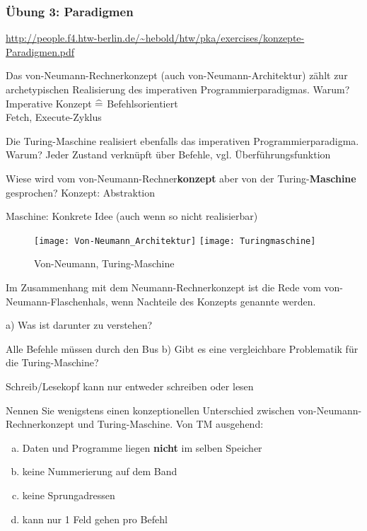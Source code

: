 \begin{card}
	\frametitle{Übung 3: Paradigmen}
	\url{http://people.f4.htw-berlin.de/~hebold/htw/pka/exercises/konzepte-Paradigmen.pdf}
\end{card}

\begin{card}
	Das von-Neumann-Rechnerkonzept (auch von-Neumann-Architektur) zählt zur archetypischen Realisierung des imperativen Programmierparadigmas. Warum?
	\hr
	Imperative Konzept $\mathrel{\widehat{=}}$ Befehlsorientiert\\
	Fetch, Execute-Zyklus
\end{card}

\begin{card}
Die Turing-Maschine realisiert ebenfalls das imperativen Programmierparadigma. Warum?
\hr
Jeder Zustand verknüpft über Befehle, vgl. Überführungsfunktion
\end{card}

\begin{card}
	Wiese wird vom von-Neumann-Rechner\textbf{konzept} aber von der Turing-\textbf{Maschine} gesprochen?
	\hr
	Konzept: Abstraktion
	
	Maschine: Konkrete Idee (auch wenn so nicht realisierbar)
	\begin{figure}[h]
	\centering
	\texttt{[image: Von-Neumann\_Architektur]}
	\texttt{[image: Turingmaschine]}
	\caption{Von-Neumann, Turing-Maschine}
	\end{figure}
\end{card}

\begin{card}
	Im Zusammenhang mit dem Neumann-Rechnerkonzept ist die Rede vom von-Neumann-Flaschenhals, wenn Nachteile des Konzepts genannte werden.
	
	\hr
	a) Was ist darunter zu verstehen?
	
	Alle Befehle müssen durch den Bus
	\hr
	b) Gibt es eine vergleichbare Problematik für die Turing-Maschine? 
	
	Schreib/Lesekopf kann nur entweder schreiben oder lesen
\end{card}

\begin{card}
	Nennen Sie wenigstens einen konzeptionellen Unterschied zwischen von-Neumann-Rechnerkonzept und Turing-Maschine.
	\hr
	Von TM ausgehend:
	
	\begin{enumerate}[a)]
	\item Daten und Programme liegen \textbf{nicht} im selben Speicher
	\item keine Nummerierung auf dem Band
	\item keine Sprungadressen
	\item kann nur 1 Feld gehen pro Befehl
	\end{enumerate}
\end{card}

